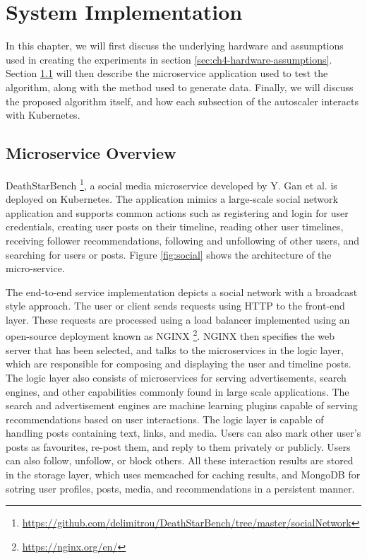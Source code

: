 \clearpage

\def\chaptertitle{System Implementation}

\lhead{\emph{\chaptertitle}}

\chapter{\chaptertitle}
\label{ch:experimental-setup}

In this chapter, we will first discuss the underlying hardware and assumptions used in creating the experiments in section \ref{sec:ch4-hardware-assumptions}. Section \ref{sec:ch4-microservice-overview} will then describe the microservice application used to test the algorithm, along with the method used to generate data. Finally, we will discuss the proposed algorithm itself, and how each subsection of the autoscaler interacts with Kubernetes.

\section{Microservice Overview}
\label{sec:ch4-microservice-overview}

DeathStarBench \footnote{\url{https://github.com/delimitrou/DeathStarBench/tree/master/socialNetwork}}, a social media microservice developed by Y. Gan et al. \cite{gan2019open} is deployed on Kubernetes. The application mimics a large-scale social network application and supports common actions such as registering and login for user credentials, creating user posts on their timeline, reading other user timelines, receiving follower recommendations, following and unfollowing of other users, and searching for users or posts. Figure \ref{fig:social} shows the architecture of the micro-service.\par

The end-to-end service implementation depicts a social network with a broadcast style approach. The user or client sends requests using HTTP to the front-end layer. These requests are processed using a load balancer implemented using an open-source deployment known as NGINX \footnote{\url{https://nginx.org/en/}}. NGINX then specifies the web server that has been selected, and talks to the microservices in the logic layer, which are responsible for composing and displaying the user and timeline posts. The logic layer also consists of microservices for serving advertisements, search engines, and other capabilities commonly found in large scale applications. The search and advertisement engines are machine learning plugins capable of serving recommendations based on user interactions. The logic layer is capable of handling posts containing text, links, and media. Users can also mark other user's posts as favourites, re-post them, and reply to them privately or publicly. Users can also follow, unfollow, or block others. All these interaction results are stored in the storage layer, which uses memcached for caching results, and MongoDB for sotring user profiles, posts, media, and recommendations in a persistent manner.

